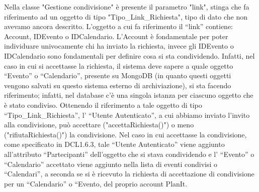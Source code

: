 \begin{listaPersonale}[DCL]{}
    Nella classe "Gestione condivisione" è presente il parametro "link", stinga che fa riferimento ad un oggetto di tipo "Tipo\_Link\_Richiesta", tipo di dato che non avevamo ancora descritto.
    L’oggetto a cui fa riferimento il “link” contiene: Account, IDEvento o IDCalendario. L’Account è fondamentale per poter individuare univocamente chi ha inviato la richiesta, invece gli IDEvento o IDCalendario sono fondamentali per definire cosa si sta condividendo. Infatti, nel caso in cui si accettasse la richiesta, il sistema deve sapere a quale oggetto “Evento” o “Calendario”, presente su MongoDB (in quanto questi oggetti vengono salvati su questo sistema esterno di archiviazione), si sta facendo riferimento; infatti, nel database c’è una singola istanza per ciascuno oggetto che è stato condiviso.
    Ottenendo il riferimento a tale oggetto di tipo “Tipo\_Link\_Richiesta”, l’ “Utente Autenticato”, a cui abbiamo inviato l’invito alla condivisione, può accettare ("accettaRichiesta()") o meno ("rifiutaRichiesta()") la condivisione. Nel caso in cui accettasse la condivisione, come specificato in DCL1.6.3, tale “Utente Autenticato” viene aggiunto all’attributo “Partecipanti” dell’oggetto che si stava condividendo e l’ “Evento” o “Calendario” accettato viene aggiunto nella lista di eventi condivisi o “Calendari”, a seconda se si è ricevuto la richiesta di accettazione di condivisione per un “Calendario” o “Evento, del proprio account PlanIt.


\end{listaPersonale}